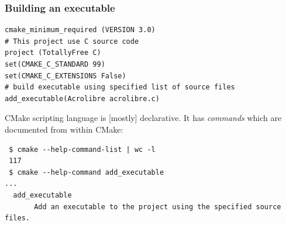 \documentclass[compress,slidestop,table,usepdftitle=false
              ]
               {beamer}
\begin{document}
\begin{frame}[fragile]
\frametitle{Building an executable}
\begin{lstlisting}[basicstyle=\scriptsize,caption=Building a simple program]
cmake_minimum_required (VERSION 3.0)
# This project use C source code
project (TotallyFree C)
set(CMAKE_C_STANDARD 99)
set(CMAKE_C_EXTENSIONS False)
# build executable using specified list of source files
add_executable(Acrolibre acrolibre.c)
\end{lstlisting}
CMake scripting language is [mostly] declarative.
It has \emph{commands} which are documented from within CMake:
{\tiny
\begin{verbatim}
 $ cmake --help-command-list | wc -l 
 117
 $ cmake --help-command add_executable
...
  add_executable
       Add an executable to the project using the specified source files.
\end{verbatim}
}
\end{frame}
\end{document}
